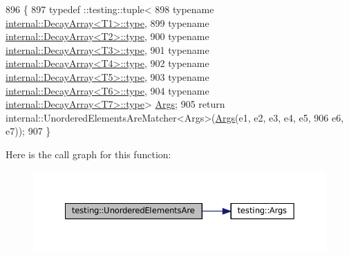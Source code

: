 \begin{DoxyCode}
896                                               \{
897   typedef ::testing::tuple<
898       \textcolor{keyword}{typename} \hyperlink{namespacegenerate__debs_a50bc9a7ecac9584553e089a448bcde58}{internal::DecayArray<T1>::type},
899       \textcolor{keyword}{typename} \hyperlink{namespacegenerate__debs_a50bc9a7ecac9584553e089a448bcde58}{internal::DecayArray<T2>::type},
900       \textcolor{keyword}{typename} \hyperlink{namespacegenerate__debs_a50bc9a7ecac9584553e089a448bcde58}{internal::DecayArray<T3>::type},
901       \textcolor{keyword}{typename} \hyperlink{namespacegenerate__debs_a50bc9a7ecac9584553e089a448bcde58}{internal::DecayArray<T4>::type},
902       \textcolor{keyword}{typename} \hyperlink{namespacegenerate__debs_a50bc9a7ecac9584553e089a448bcde58}{internal::DecayArray<T5>::type},
903       \textcolor{keyword}{typename} \hyperlink{namespacegenerate__debs_a50bc9a7ecac9584553e089a448bcde58}{internal::DecayArray<T6>::type},
904       \textcolor{keyword}{typename} \hyperlink{namespacegenerate__debs_a50bc9a7ecac9584553e089a448bcde58}{internal::DecayArray<T7>::type}> 
      \hyperlink{namespacetesting_a09ac462e8d6ed468cbfaa9c767aee0aa}{Args};
905   \textcolor{keywordflow}{return} internal::UnorderedElementsAreMatcher<Args>(\hyperlink{namespacetesting_a09ac462e8d6ed468cbfaa9c767aee0aa}{Args}(e1, e2, e3, e4, e5,
906       e6, e7));
907 \}
\end{DoxyCode}
Here is the call graph for this function\+:
\nopagebreak
\begin{figure}[H]
\begin{center}
\leavevmode
\includegraphics[width=350pt]{namespacetesting_add6e16fe24c45e39e92c0d19c04acf11_cgraph}
\end{center}
\end{figure}
\mbox{\label{namespacetesting_a0f30358234947d21c7f39f15a8395d04}} 
